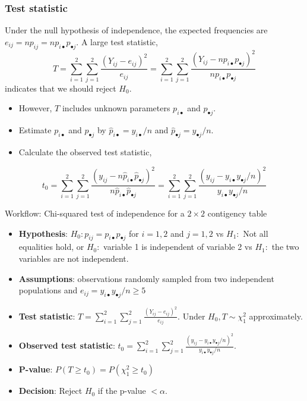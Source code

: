 \documentclass[a4paper]{article}\usepackage[]{graphicx}\usepackage[]{xcolor}
\begin{document}
\subsubsection{Test statistic}
Under the null hypothesis of independence, the expected frequencies are \( e_{ij} = np_{ij} = np_{i \bullet}p_{\bullet j} \).
A large test statistic,
\[ 
	T = \sum_{i=1}^{2} \sum_{j=1}^{2} \frac{(Y_{ij} - e_{ij})^2}{e_{ij}} =  \sum_{i=1}^{2} \sum_{j=1}^{2} \frac{(Y_{ij} - np_{i \bullet}p_{\bullet j})^2}{np_{i \bullet}p_{\bullet j}}
\] 
indicates that we should reject \( H_0 \).
\begin{itemize}
	\item However, \( T \) includes unknown parameters \( p_{i \bullet} \) and \( p_{\bullet j} \).
	\item Estimate \( p_{i \bullet} \) and \( p_{\bullet j} \) by \( \hat{p}_{i \bullet} = y_{i \bullet}/n \) and \( \hat{p}_{\bullet j} = y_{\bullet j}/n \).
	\item Calculate the observed test statistic,
\end{itemize}
\[
	t_0 = \sum_{i=1}^{2} \sum_{j=1}^{2} \frac{(y_{ij} - n\hat{p}_{i \bullet}\hat{p}_{\bullet j})^2}{n\hat{p}_{i \bullet}\hat{p}_{\bullet j}} = \sum\limits_{i=1}^{2} \sum\limits_{j=1}^{2} \frac{(y_{ij} - y_{i \bullet}y_{\bullet j}/n)^2}{y_{i \bullet}y_{\bullet j}/n}
\]
\begin{redbox}{Workflow: Chi-squared test of independence for a \( 2 \times 2 \) contigency table}
	\begin{itemize}
		\item \textbf{Hypothesis}: \( H_0: p_{ij} = p_{i \bullet} p_{\bullet j} \) for \( i = 1,2 \) and \( j = 1,2 \) vs \( H_1: \) Not all equalities hold, or \( H_0: \) variable 1 is independent of variable 2 vs \( H_1: \) the two variables are not independent.
		\item \textbf{Assumptions}: observations randomly sampled from two independent populations and \( e_{ij} =y_{i \bullet} y_{\bullet j}/n \geq 5 \)
		\item \textbf{Test statistic}: \( T = \sum\limits_{i=1}^{2}\sum\limits_{j=1}^{2} \frac{(Y_{ij} - e_{ij})^2}{e_{ij}} \). Under \( H_0, T \sim \chi^2_1 \) approximately.
		\item \textbf{Observed test statistic}: \( t_0 = \sum\limits_{i=1}^{2} \sum\limits_{j=1}^{2} \frac{(y_{ij} - y_{i \bullet}y_{\bullet j}/n)^2}{y_{i \bullet}y_{\bullet j}/n} \).
		\item \textbf{P-value}: \( P(T\geq t_0) = P(\chi^2_1 \geq t_0) \)
		\item \textbf{Decision}: Reject \( H_0 \) if the p-value \( < \alpha \).
	\end{itemize}
\end{redbox}
\end{document}

